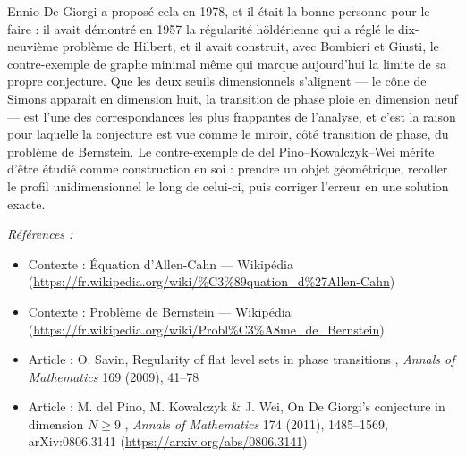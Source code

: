 \documentclass[11pt]{article}
\newenvironment{refs}{\par\small\noindent\emph{Références :}\begin{itemize}\setlength\itemsep{0pt}}{\end{itemize}\normalsize}
\begin{document}
\noindent Ennio De Giorgi a proposé cela en 1978, et il était la bonne personne pour le
faire : il avait démontré en 1957 la régularité höldérienne qui a réglé le dix-neuvième problème de
Hilbert, et il avait construit, avec Bombieri et Giusti, le contre-exemple de graphe minimal
même qui marque aujourd'hui la limite de sa propre conjecture. Que les deux seuils dimensionnels
s'alignent --- le cône de Simons apparaît en dimension huit, la transition de phase ploie en
dimension neuf --- est l'une des correspondances les plus frappantes de l'analyse, et c'est la raison
pour laquelle la conjecture est vue comme le miroir, côté transition de phase, du problème de
Bernstein. Le contre-exemple de del Pino--Kowalczyk--Wei mérite d'être étudié comme construction en
soi : prendre un objet géométrique, recoller le profil unidimensionnel le long de celui-ci, puis
corriger l'erreur en une solution exacte.

\begin{refs}
\item Contexte : Équation d'Allen-Cahn --- Wikipédia (\url{https://fr.wikipedia.org/wiki/%C3%89quation_d%27Allen-Cahn})
\item Contexte : Problème de Bernstein --- Wikipédia (\url{https://fr.wikipedia.org/wiki/Probl%C3%A8me_de_Bernstein})
\item Article : O. Savin, \og{} Regularity of flat level sets in phase transitions \fg{}, \textit{Annals of Mathematics} 169 (2009), 41--78
\item Article : M. del Pino, M. Kowalczyk \& J. Wei, \og{} On De Giorgi's conjecture in dimension $N \ge 9$ \fg{}, \textit{Annals of Mathematics} 174 (2011), 1485--1569, arXiv:0806.3141 (\url{https://arxiv.org/abs/0806.3141})
\end{refs}

\bigskip
\end{document}
